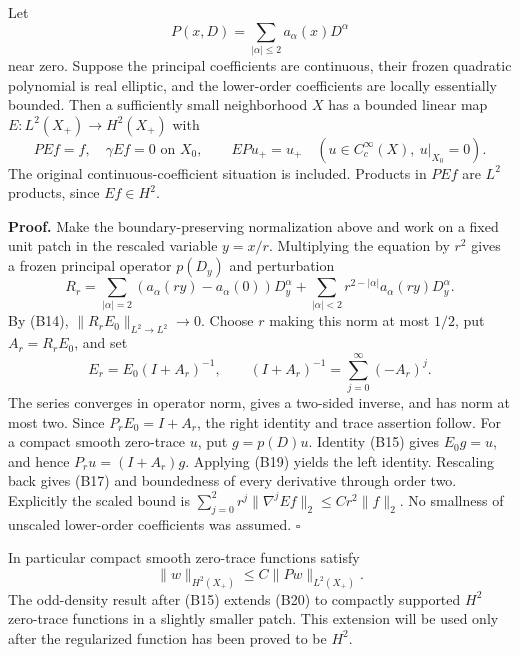 \documentclass[
  11pt,
]{article}
\makeatletter
\let\ReaderOriginalAnchorStart\hyper@anchorstart
\let\ReaderOriginalAnchorEnd\hyper@anchorend
\let\ReaderPendingAliases\@empty
\def\ReaderArmAliases#1{\gdef\ReaderPendingAliases{#1}}
\def\hyper@anchorstart#1{\ReaderIfNativeAnchorTF{#1}{\ReaderPendingAliases\global\let\ReaderPendingAliases\@empty}{}\ReaderOriginalAnchorStart{#1}}
\makeatother
\begin{document}
Let \[
 P(x,D)=\sum_{|\alpha|\leq2}a_\alpha(x)D^\alpha \tag{B16}
\] near zero. Suppose the principal coefficients are continuous, their
frozen quadratic polynomial is real elliptic, and the lower-order
coefficients are locally essentially bounded. Then a sufficiently small
neighborhood \(X\) has a bounded linear map \(E:L^2(X_+)\to H^2(X_+)\)
with \[
 PEf=f,\quad\gamma Ef=0\text{ on }X_0,\qquad
 EPu_+=u_+\quad(u\in C_c^\infty(X),\ u|_{X_0}=0). \tag{B17}
\] The original continuous-coefficient situation is included. Products
in \(PEf\) are \(L^2\) products, since \(Ef\in H^2\).

\textbf{Proof.} Make the boundary-preserving normalization above and
work on a fixed unit patch in the rescaled variable \(y=x/r\).
Multiplying the equation by \(r^2\) gives a frozen principal operator
\(p(D_y)\) and perturbation \[
 R_r=\sum_{|\alpha|=2}(a_\alpha(ry)-a_\alpha(0))D_y^\alpha
       +\sum_{|\alpha|<2}r^{2-|\alpha|}a_\alpha(ry)D_y^\alpha. \tag{B18}
\] By (B14), \(\|R_rE_0\|_{L^2\to L^2}\to0\). Choose \(r\) making this
norm at most \(1/2\), put \(A_r=R_rE_0\), and set \[
 E_r=E_0(I+A_r)^{-1},\qquad (I+A_r)^{-1}=\sum_{j=0}^\infty(-A_r)^j. \tag{B19}
\] The series converges in operator norm, gives a two-sided inverse, and
has norm at most two. Since \(P_rE_0=I+A_r\), the right identity and
trace assertion follow. For a compact smooth zero-trace \(u\), put
\(g=p(D)u\). Identity (B15) gives \(E_0g=u\), and hence
\(P_ru=(I+A_r)g\). Applying (B19) yields the left identity. Rescaling
back gives (B17) and boundedness of every derivative through order two.
Explicitly the scaled bound is
\(\sum_{j=0}^2r^j\|\nabla^j Ef\|_2\leq Cr^2\|f\|_2\). No smallness of
unscaled lower-order coefficients was assumed. \(\square\)

In particular compact smooth zero-trace functions satisfy \[
 \|w\|_{H^2(X_+)}\leq C\|Pw\|_{L^2(X_+)}. \tag{B20}
\] The odd-density result after (B15) extends (B20) to compactly
supported \(H^2\) zero-trace functions in a slightly smaller patch. This
extension will be used only after the regularized function has been
proved to be \(H^2\).

\ReaderArmAliases{\ReaderOriginalAnchorStart{AN03-SBD-006}\ReaderOriginalAnchorEnd\begingroup\expandafter\def\csname @currentHref\endcsname{AN03-SBD-006}\label{AN03-SBD-006}\endgroup\ReaderOriginalAnchorStart{an03-sbd-006-recovering-second-derivatives-at-a-flat-boundary}\ReaderOriginalAnchorEnd\begingroup\expandafter\def\csname @currentHref\endcsname{an03-sbd-006-recovering-second-derivatives-at-a-flat-boundary}\label{an03-sbd-006-recovering-second-derivatives-at-a-flat-boundary}\endgroup\ReaderOriginalAnchorStart{6-recovering-second-derivatives-at-a-flat-boundary}\ReaderOriginalAnchorEnd\begingroup\expandafter\def\csname @currentHref\endcsname{6-recovering-second-derivatives-at-a-flat-boundary}\label{6-recovering-second-derivatives-at-a-flat-boundary}\endgroup\ReaderOriginalAnchorStart{recovering-second-derivatives-at-a-flat-boundary}\ReaderOriginalAnchorEnd}
\end{document}

